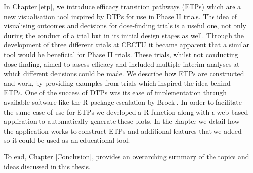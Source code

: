 In Chapter \ref{etp}, we introduce efficacy transition pathways (ETPs) which are a new visualisation tool inspired by DTPs for use in Phase \RN{2} trials. The idea of visualising outcomes and decisions for dose-finding trials is a useful one, not only during the conduct of a trial but in its initial design stages as well. Through the development of three different trials at CRCTU it became apparent that a similar tool would be beneficial for Phase \RN{2} trials. These trials, whilst not conducting dose-finding, aimed to assess efficacy and included multiple interim analyses at which different decisions could be made. We describe how ETPs are constructed and work, by providing examples from trials which inspired the idea behind ETPs. One of the success of DTPs was its ease of implementation through available software like the R package escalation by Brock \cite{brockModularApproachDose2020}. In order to facilitate the same ease of use for ETPs we developed a R function along with a web based application to automatically generate these plots. In the chapter we detail how the application works to construct ETPs and additional features that we added so it could be used as an educational tool. 

To end, Chapter \ref{Conclusion}, provides an overarching summary of the topics and ideas discussed in this thesis. 



